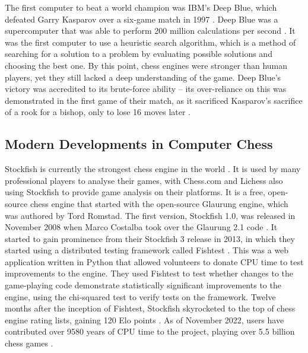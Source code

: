 \documentclass[%
 superscriptaddress,
showpacs,preprintnumbers,
 amsmath,
 amssymb,
 aps,
 pra,
showkeys,
onecolumn,
notitlepage,
11pt,
tightenlines      %
]{revtex4-1}
\begin{document}
The first computer to beat a world champion was IBM's Deep Blue, which defeated Garry Kasparov over a six-game match in 1997 \cite{seirawan1997implications}. Deep Blue was a supercomputer that was able to perform 200 million calculations per second \cite{strogatz2018one}. It was the first computer to use a heuristic search algorithm, which is a method of searching for a solution to a problem by evaluating possible solutions and choosing the best one. By this point, chess engines were stronger than human players, yet they still lacked a deep understanding of the game. Deep Blue's victory was accredited to its brute-force ability -- its over-reliance on this was demonstrated in the first game of their match, as it sacrificed Kasparov's sacrifice of a rook for a bishop, only to lose 16 moves later \cite{strogatz2018one}.

\subsection{Modern Developments in Computer Chess}
Stockfish is currently the strongest chess engine in the world \cite{computerChessRatingLists}. It is used by many professional players to analyse their games, with Chess.com and Lichess also using Stockfish to provide game analysis on their platforms. It is a free, open-source chess engine that started with the open-source Glaurung engine, which was authored by Tord Romstad. The first version, Stockfish 1.0, was released in November 2008 when Marco Costalba took over the Glaurung 2.1 code \cite{aboutStockfish}. It started to gain prominence from their Stockfish 3 release in 2013, in which they started using a distributed testing framework called Fishtest \cite{fishtestDistributedTestingFramework}. This was a web application written in Python that allowed volunteers to donate CPU time to test improvements to the engine. They used Fishtest to test whether changes to the game-playing code demonstrate statistically significant improvements to the engine, using the chi-squared test to verify tests on the framework. Twelve months after the inception of Fishtest, Stockfish skyrocketed to the top of chess engine rating lists, gaining 120 Elo points \cite{stockfishRatingsAfterFishtest}. As of November 2022, users have contributed over 9580 years of CPU time to the project, playing over 5.5 billion chess games \cite{fishtestUsers}. 
\end{document}
